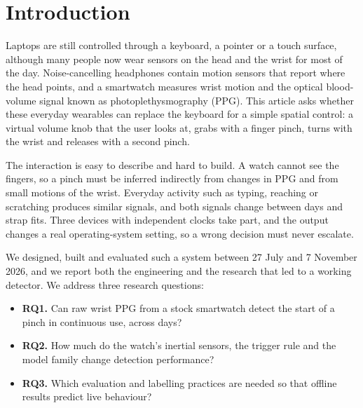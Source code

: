 
\section{Introduction}\label{sec:intro}

Laptops are still controlled through a keyboard, a pointer or a touch surface, although many people now wear sensors on the head and the wrist for most of the day. Noise-cancelling headphones contain motion sensors that report where the head points, and a smartwatch measures wrist motion and the optical blood-volume signal known as photoplethysmography (PPG). This article asks whether these everyday wearables can replace the keyboard for a simple spatial control: a virtual volume knob that the user looks at, grabs with a finger pinch, turns with the wrist and releases with a second pinch.

The interaction is easy to describe and hard to build. A watch cannot see the fingers, so a pinch must be inferred indirectly from changes in PPG and from small motions of the wrist. Everyday activity such as typing, reaching or scratching produces similar signals, and both signals change between days and strap fits. Three devices with independent clocks take part, and the output changes a real operating-system setting, so a wrong decision must never escalate.

We designed, built and evaluated such a system between 27 July and 7 November 2026, and we report both the engineering and the research that led to a working detector. We address three research questions:
\begin{itemize}
  \item \textbf{RQ1.} Can raw wrist PPG from a stock smartwatch detect the start of a pinch in continuous use, across days?
  \item \textbf{RQ2.} How much do the watch's inertial sensors, the trigger rule and the model family change detection performance?
  \item \textbf{RQ3.} Which evaluation and labelling practices are needed so that offline results predict live behaviour?
\end{itemize}

